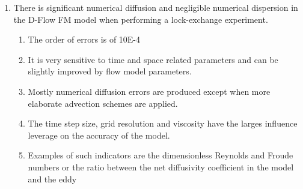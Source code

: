 \begin{enumerate}
\def\labelenumi{\arabic{enumi}.}
\item
  There is significant numerical diffusion and negligible numerical
  dispersion in the D-Flow FM model when performing a lock-exchange
  experiment.

  \begin{enumerate}
  \def\labelenumii{\arabic{enumii}.}
  \item
    The order of errors is of 10E-4
  \item
    It is very sensitive to time and space related parameters and can be
    slightly improved by flow model parameters.
  \item
    Mostly numerical diffusion errors are produced except when more
    elaborate advection schemes are applied.
  \item
    The time step size, grid resolution and viscosity have the larges
    influence leverage on the accuracy of the model.
  \item
    Examples of such indicators are the dimensionless Reynolds and
    Froude numbers or the ratio between the net diffusivity coefficient
    in the model and the eddy
  \end{enumerate}
\end{enumerate}

